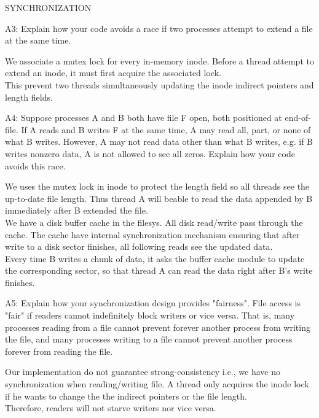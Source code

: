 \begin{aspect}{SYNCHRONIZATION}
	\begin{qc}
		A3: Explain how your code avoids a race if two processes attempt to
		extend a file at the same time.
	\end{qc}
	We associate a mutex lock for every in-memory inode.
	Before a thread attempt to extend an inode, it must first acquire the associated lock.\\
	This prevent two threads simultaneously updating the inode indirect pointers and length fields.

	\begin{qc}
		A4: Suppose processes A and B both have file F open, both
		positioned at end-of-file.  If A reads and B writes F at the same
		time, A may read all, part, or none of what B writes.  However, A
		may not read data other than what B writes, e.g. if B writes
		nonzero data, A is not allowed to see all zeros.  Explain how your
		code avoids this race.
	\end{qc}
	We uses the mutex lock in inode to protect the length field so all threads see the up-to-date file length.
	Thus thread A will beable to read the data appended by B immediately after B extended the file.\\

	We have a disk buffer cache in the filesys. All disk read/write pass through the cache.
	The cache have internal synchronization mechanism ensuring that after write to a disk sector finishes,
	all following reads see the updated data.\\
	Every time B writes a chunk of data, it asks the buffer cache module to update the corresponding sector,
	so that thread A can read the data right after B's write finishes.

	\begin{qc}
		A5: Explain how your synchronization design provides "fairness".
		File access is "fair" if readers cannot indefinitely block writers
		or vice versa.  That is, many processes reading from a file cannot
		prevent forever another process from writing the file, and many
		processes writing to a file cannot prevent another process forever
		from reading the file.
	\end{qc}
	Our implementation do not guarantee strong-consistency i.e.,
	we have no synchronization when reading/writing file.
	A thread only acquires the inode lock if he wants to change the the indirect pointers or the file length.\\
	Therefore, readers will not starve writers nor vice versa.
\end{aspect}


